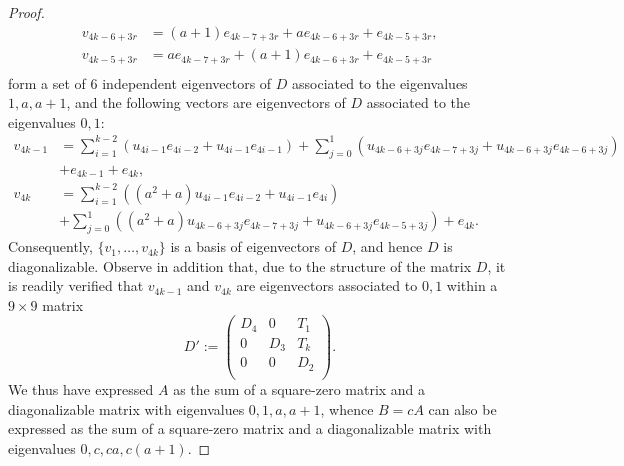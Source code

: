 \documentclass[10pt,a4paper]{amsart}
\begin{document}
\begin{proof}
\begin{align*}
 v_{4k-6+3r}&=(a+1)e_{4k-7+3r}+a e_{4k-6+3r}+e_{4k-5+3r},\\
 v_{4k-5+3r}&=a e_{4k-7+3r}+(a+1) e_{4k-6+3r}+e_{4k-5+3r}\\
\end{align*}
form a set of $6$ independent eigenvectors of $D$ associated to the eigenvalues $1,a,a+1$, and the following vectors are eigenvectors of $D$ associated to the eigenvalues $0,1$:
\begin{align*}
  v_{4k-1}&=\sum_{i=1}^{k-2}    (u_{4i-1} e_{4i-2}+ u_{4i-1} e_{4i-1})+ \sum_{j=0}^{1} (u_{4k-6+3j} e_{4k-7+3j}+u_{4k-6+3j} e_{4k-6+3j})\\&+    e_{4k-1}+   e_{4k}, \quad  \\
  v_{4k}&=\sum_{i=1}^{k-2}   ((a^2+a) u_{4i-1} e_{4i-2}+ u_{4i-1} e_{4i})\\& +\sum_{j=0}^{1}((a^2+a) u_{4k-6+3j} e_{4k-7+3j} +u_{4k-6+3j} e_{4k-5+3j})+ e_{4k}.
\end{align*}
Consequently, $\{v_1,\dots, v_{4k}\}$ is a basis of eigenvectors of $D$, and hence $D$ is diagonalizable. Observe in addition that, due to the structure of the matrix
$D$, it is readily verified that $v_{4k-1}$ and $v_{4k}$ are eigenvectors associated to $0,1$ within a $9\times 9$ matrix
$$D':=\left(
  \begin{array}{ccc}
    D_4 &0& T_1 \\
    0 & D_3& T_k \\
     0 & 0& D_2 \\
  \end{array}
\right).
$$
We thus have expressed $A$ as the sum of a square-zero matrix and a diagonalizable matrix with eigenvalues $0,1,a,a+1$, whence $B=cA$ can also be expressed as the sum of a square-zero matrix and a diagonalizable matrix with eigenvalues $0,c,ca, c(a+1)$.

\medskip


\end{proof}
\end{document}
